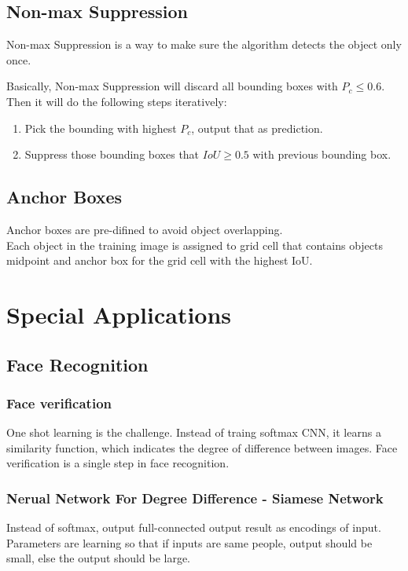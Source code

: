 \documentclass{article}
\begin{document}
	\subsection{Non-max Suppression}
		\begin{flushleft}
			Non-max Suppression is a way to make sure the algorithm detects the object only once.
		\end{flushleft}
		\begin{flushleft}
			Basically, Non-max Suppression will discard all bounding boxes with $P_c \leq 0.6$.\\
			Then it will do the following steps iteratively:
			\begin{enumerate}
				\item Pick the bounding with highest $P_c$, output that as prediction.
				\item Suppress those bounding boxes that $IoU \geq 0.5$ with previous bounding box.
			\end{enumerate}
		\end{flushleft}
	\subsection{Anchor Boxes}
		\begin{flushleft}
			Anchor boxes are pre-difined to avoid object overlapping.\\
			Each object in the training image is assigned to grid cell that contains objects midpoint and anchor box for the grid cell with the highest IoU.
		\end{flushleft}

\section{Special Applications}
	\subsection{Face Recognition}
		\subsubsection{Face verification}
			\begin{flushleft}
				One shot learning is the challenge. Instead of traing softmax CNN, it learns a similarity function, which indicates the degree of difference between images. Face verification is a single step in face recognition.
			\end{flushleft}
		\subsubsection{Nerual Network For Degree Difference - Siamese Network}
			\begin{flushleft}
				Instead of softmax, output full-connected output result as encodings of input. Parameters are learning so that if inputs are same people, output should be small, else the output should be large.
			\end{flushleft}
\end{document}
